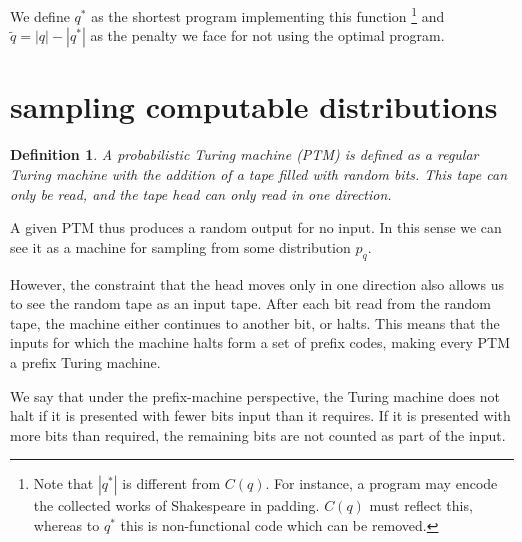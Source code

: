 \documentclass[10pt,a4paper,oneside]{article}
\newtheorem{dfn}{Definition}
\begin{document}
We define $q^*$ as the shortest program implementing this function \footnote{Note that $|q^*|$ is different from $C(q)$. For instance, a program may encode the collected works of Shakespeare in padding. $C(q)$ must reflect this, whereas to $q^*$ this is non-functional code which can be removed.} and $\tilde{q} = |q| - |q^*|$ as the penalty we face for not using the optimal program. 

\section*{sampling computable distributions}

\begin{dfn}
A \emph{probabilistic Turing machine} (PTM) is defined as a regular Turing machine with the addition of a tape filled with random bits. This tape can only be read, and the tape head can only read in one direction.
\end{dfn}

A given PTM thus produces a random output for no input. In this sense we can see it as a machine for sampling from some distribution $p_q$. 

However, the constraint that the head moves only in one direction also allows us to see the random tape as an input tape. After each bit read from the random tape, the machine either continues to another bit, or halts. This means that the inputs for which the machine halts form a set of prefix codes, making every PTM a prefix Turing machine.

We say that under the prefix-machine perspective, the Turing machine does not halt if it is presented with fewer bits input than it requires. If it is presented with more bits than required, the remaining bits are not counted as part of the input.
\end{document}

